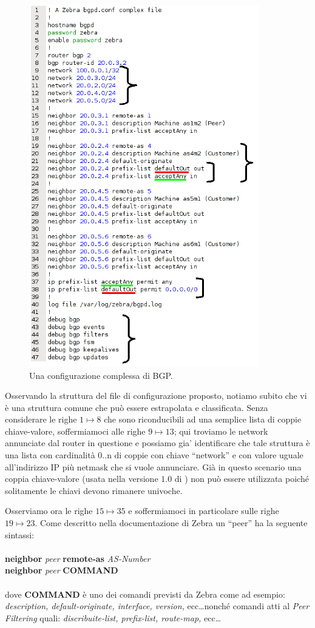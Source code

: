\begin{figure}[!htb]
	\centering
	\includegraphics[width=10cm]{images/bgp_conf_schema.png}
	\caption{Una configurazione complessa di BGP.}
	\label{figura:bgp_conf_schema}
\end{figure}

Osservando la struttura del file di configurazione proposto, notiamo subito che vi è una struttura comune che può essere estrapolata e classificata. Senza considerare le righe $1\mapsto8$ che sono riconducibili ad una semplice lista di coppie chiave-valore, soffermiamoci alle righe $9\mapsto13$; qui troviamo le network annunciate dal router in questione e possiamo gia' identificare che tale struttura è una lista con cardinalità 0..n di coppie con chiave ``network'' e con valore uguale all'indirizzo IP più netmask che si vuole annunciare. Già in questo scenario una coppia chiave-valore (usata nella versione $1.0$ di \visualnetkit{}) non può essere utilizzata poiché solitamente le chiavi devono rimanere univoche.

Osserviamo ora le righe $15\mapsto35$ e soffermiamoci in particolare sulle righe $19\mapsto23$. Come descritto nella documentazione di Zebra\cite{ZEBRADOC} un ``peer'' ha la seguente sintassi:
\\
\\
\textbf{neighbor} \textit{peer} \textbf{remote-as} \textit{AS-Number}
\\
\textbf{neighbor} \textit{peer} \textbf{COMMAND}
\\
\\
dove \textbf{COMMAND} è uno dei comandi previsti da Zebra come ad esempio: \emph{description, default-originate, interface, version,} ecc\ldots nonché comandi atti al \emph{Peer Filtering} quali: \emph{discribuite-list, prefix-list, route-map,} ecc\ldots


